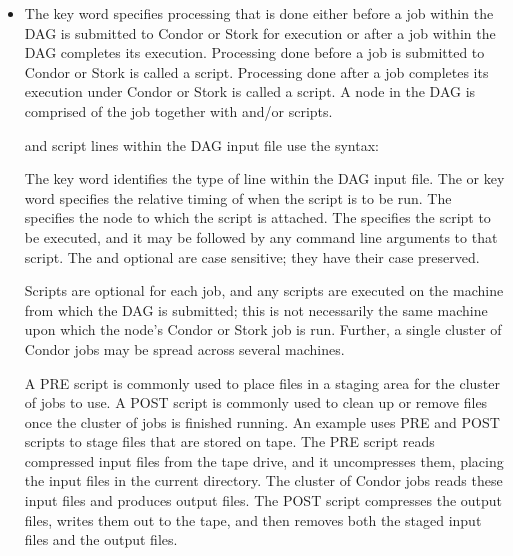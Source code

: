 \begin{itemize}
\label{dagman:SCRIPT}
\item {}

The  key word specifies
processing that is done either before a job within
the DAG is submitted to Condor or Stork for execution
or after
a job within
the DAG completes its execution.
Processing done before a job is submitted to Condor or Stork is
called a  script.
Processing done after a job completes
its execution under Condor or Stork is
called a  script.
A node in the DAG is comprised of the job together with
 and/or  scripts.

 and  script lines within the DAG input file
use the syntax:

    

     

The  key word identifies the type of line within
the DAG input file.
The  or  key word
specifies the relative timing of when the script is to be run.
The  specifies the node to which the script is attached.
The 
specifies the script to be executed, and it
may be followed by any command line arguments to that script.
The  and optional  are
case sensitive; they have their case preserved.  

Scripts are optional for each job, and
any scripts are executed on the machine
from which the DAG is submitted; this is not necessarily
the same machine upon which the node's Condor or Stork job is run.
Further, a single cluster of Condor jobs may be
spread across several machines.

A PRE script is commonly used
to place files in a staging area for the cluster of jobs to use.
A POST script is commonly used
to clean up or remove files once the cluster of jobs is finished running.
An example uses PRE and POST scripts to stage files
that are stored on tape.
The PRE script reads compressed input files from the tape drive,
and it uncompresses them, placing the input files in the current directory.
The cluster of Condor jobs reads these input files
and produces output files.
The POST script compresses the output files, writes them out to
the tape, and then removes both the staged input files and the output files.


\end{itemize}
